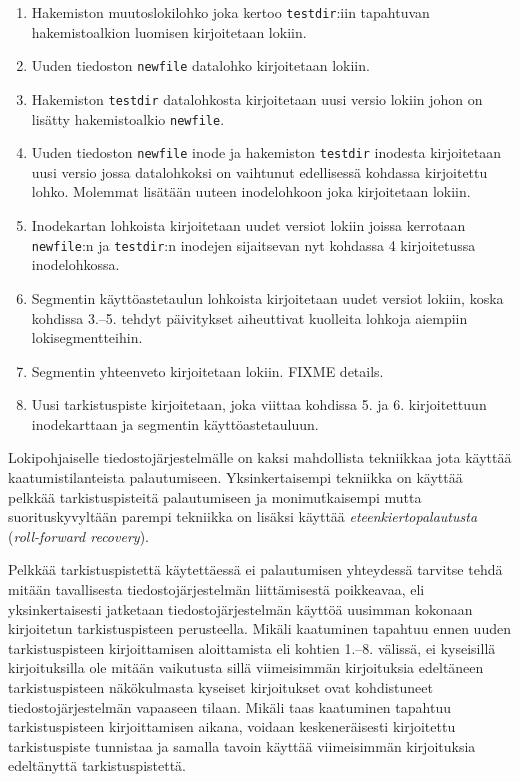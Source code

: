 \begin{enumerate}
    \item{Hakemiston muutoslokilohko joka kertoo \texttt{testdir}:iin tapahtuvan hakemistoalkion luomisen kirjoitetaan lokiin.}
    \item{Uuden tiedoston \texttt{newfile} datalohko kirjoitetaan lokiin.}
    \item{Hakemiston \texttt{testdir} datalohkosta kirjoitetaan uusi versio lokiin johon on lisätty hakemistoalkio \texttt{newfile}.}
    \item{Uuden tiedoston \texttt{newfile} inode ja hakemiston \texttt{testdir} inodesta kirjoitetaan uusi versio jossa datalohkoksi on vaihtunut edellisessä kohdassa kirjoitettu lohko. Molemmat lisätään uuteen inodelohkoon joka kirjoitetaan lokiin.}
    \item{Inodekartan lohkoista kirjoitetaan uudet versiot lokiin joissa kerrotaan \texttt{newfile}:n ja \texttt{testdir}:n inodejen sijaitsevan nyt kohdassa 4 kirjoitetussa inodelohkossa.}
    \item{Segmentin käyttöastetaulun lohkoista kirjoitetaan uudet versiot lokiin, koska kohdissa 3.--5. tehdyt päivitykset aiheuttivat kuolleita lohkoja aiempiin lokisegmentteihin.}
    \item{Segmentin yhteenveto kirjoitetaan lokiin. FIXME details.}
    \item{Uusi tarkistuspiste kirjoitetaan, joka viittaa kohdissa 5. ja 6. kirjoitettuun inodekarttaan ja segmentin käyttöastetauluun.}
\end{enumerate}
Lokipohjaiselle tiedostojärjestelmälle on kaksi mahdollista tekniikkaa jota käyttää kaatumistilanteista palautumiseen.
Yksinkertaisempi tekniikka on käyttää pelkkää tarkistuspisteitä palautumiseen ja monimutkaisempi mutta suorituskyvyltään parempi tekniikka on lisäksi käyttää \emph{eteenkiertopalautusta} (\emph{roll-forward recovery}).

Pelkkää tarkistuspistettä käytettäessä ei palautumisen yhteydessä tarvitse tehdä mitään tavallisesta tiedostojärjestelmän liittämisestä poikkeavaa,
eli yksinkertaisesti jatketaan tiedostojärjestelmän käyttöä uusimman kokonaan kirjoitetun tarkistuspisteen perusteella.
Mikäli kaatuminen tapahtuu ennen uuden tarkistuspisteen kirjoittamisen aloittamista eli kohtien 1.--8. välissä,
ei kyseisillä kirjoituksilla ole mitään vaikutusta sillä viimeisimmän kirjoituksia edeltäneen tarkistuspisteen näkökulmasta kyseiset kirjoitukset ovat kohdistuneet tiedostojärjestelmän vapaaseen tilaan.
Mikäli taas kaatuminen tapahtuu tarkistuspisteen kirjoittamisen aikana,
voidaan keskeneräisesti kirjoitettu tarkistuspiste tunnistaa ja samalla tavoin käyttää viimeisimmän kirjoituksia edeltänyttä tarkistuspistettä.

